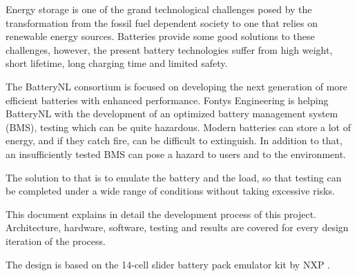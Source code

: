 \IEEEPARstart
{E}{nergy} storage is one of the grand technological challenges posed by the transformation from the
fossil fuel dependent society to one that relies on renewable energy sources. Batteries provide
some good solutions to these challenges, however, the present battery technologies suffer from
high weight, short lifetime, long charging time and limited safety.

The BatteryNL consortium is focused on developing the next generation of more efficient
batteries with enhanced performance. Fontys Engineering is helping BatteryNL with the development 
of an optimized battery management system (BMS), testing which can be quite
hazardous. Modern batteries can store a lot of energy, and if they catch fire, can be difficult to
extinguish. In addition to that, an insufficiently tested BMS can pose a hazard to users and to
the environment.

The solution to that is to emulate the battery and the load, so that testing can be completed
under a wide range of conditions without taking excessive risks.

This document explains in detail the development process of this project. 
Architecture, hardware, software, testing and results are covered for every design 
iteration of the process. 

The design is based on the 14-cell slider battery pack emulator kit by 
NXP \cite{UM11349}.
